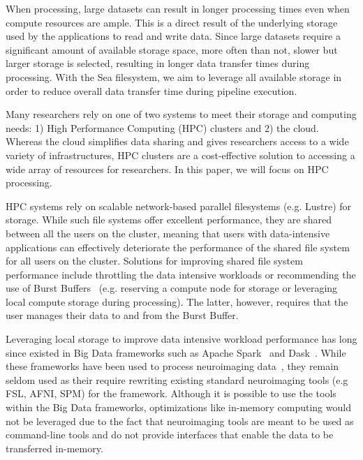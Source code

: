     When processing, large datasets can result in longer processing times even when compute resources are ample.
    This is a direct result of the underlying storage used by the applications to read and write data. Since large
    datasets require a significant amount of available storage space, more often than not, slower but larger storage is
    selected, resulting in longer data transfer times during processing. With the Sea filesystem, we aim to
    leverage all available storage in order to reduce overall data transfer time during pipeline execution.
    
    Many researchers rely on one of two systems to meet their storage and computing needs: 1) High Performance 
    Computing (HPC) clusters and 2) the cloud. Whereas the cloud simplifies data sharing and gives researchers
    access to a wide variety of infrastructures, HPC clusters are a cost-effective solution to accessing a wide
    array of resources for researchers. In this paper, we will focus on HPC processing.
    
    HPC systems rely on scalable network-based parallel filesystems (e.g. Lustre) for storage. While such file
    systems offer excellent performance, they are shared between all the users on the cluster, meaning that users
    with data-intensive applications can effectively deteriorate the performance of the shared file system for all users on
    the cluster. Solutions for improving shared file system performance include throttling the data intensive workloads
    or recommending the use of Burst Buffers~\cite{bb} (e.g. reserving a compute node for storage or leveraging
    local compute storage during processing). The latter, however, requires that the user manages their data to
    and from the Burst Buffer.
    
    Leveraging local storage to improve data intensive workload performance has long since existed in Big Data
    frameworks such as Apache Spark~\cite{spark} and Dask~\cite{dask}. While these frameworks have been used to
    process neuroimaging data~\cite{manypapers}, they remain seldom used as their require rewriting existing
    standard neuroimaging tools (e.g FSL, AFNI, SPM) for the framework. Although it is possible to use the
    tools within the Big Data frameworks, optimizations like in-memory computing would not be leveraged due to 
    the fact that neuroimaging tools are meant to be used as command-line tools and do not provide interfaces that 
    enable the data to be transferred in-memory.
    
